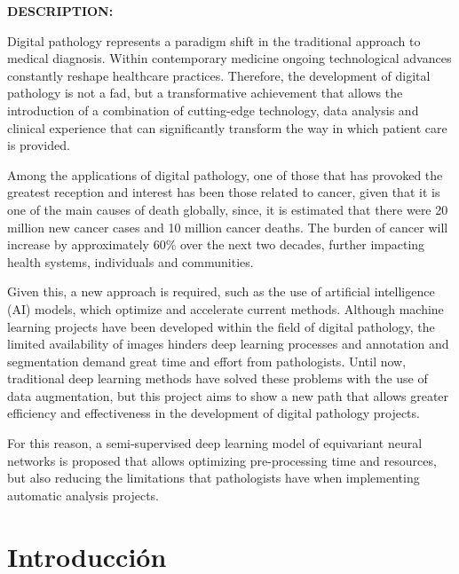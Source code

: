 \documentclass[12pt,letterpaper,final, openany]{scrbook}
\begin{document}
\vspace*{5mm}

\textbf{DESCRIPTION:}

Digital pathology represents a paradigm shift in the traditional approach to medical diagnosis. Within contemporary medicine ongoing technological advances constantly reshape healthcare practices. Therefore, the development of digital pathology is not a fad, but a transformative achievement that allows the introduction of a combination of cutting-edge technology, data analysis and clinical experience that can significantly transform the way in which patient care is provided.

Among the applications of digital pathology, one of those that has provoked the greatest reception and interest has been those related to cancer, given that it is one of the main causes of death globally, since, it is estimated that there were 20 million new cancer cases and 10 million cancer deaths. The burden of cancer will increase by approximately 60\% over the next two decades, further impacting health systems, individuals and communities.

Given this, a new approach is required, such as the use of artificial intelligence (AI) models, which optimize and accelerate current methods. Although machine learning projects have been developed within the field of digital pathology, the limited availability of images hinders deep learning processes and annotation and segmentation demand great time and effort from pathologists. Until now, traditional deep learning methods have solved these problems with the use of data augmentation, but this project aims to show a new path that allows greater efficiency and effectiveness in the development of digital pathology projects.


For this reason, a semi-supervised deep learning model of equivariant neural networks is proposed that allows optimizing pre-processing time and resources, but also reducing the limitations that pathologists have when implementing automatic analysis projects.


\vspace*{2cm}


\newpage
\chapter{Introducción}
\end{document}
